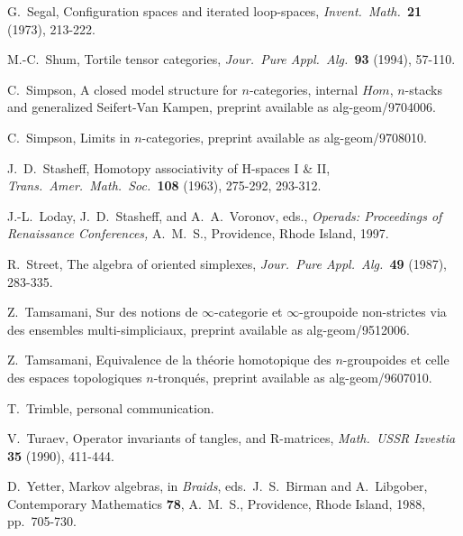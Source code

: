 {\begin{thebibliography}{10}
 G.\ Segal, Configuration spaces and iterated loop-spaces, 
{\sl Invent.\ Math.\ }{\bf 21} (1973), 213-222.

 M.-C.\ Shum, Tortile tensor categories, 
{\sl Jour.\ Pure Appl.\ Alg.\ }{\bf 93} (1994), 57-110.

 C.\ Simpson, A closed model structure for
$n$-categories, internal $Hom$, $n$-stacks and generalized Seifert-Van
Kampen, preprint available as alg-geom/9704006.

 C.\ Simpson, Limits in $n$-categories, preprint
available as alg-geom/9708010.

 J.\ D.\ Stasheff, Homotopy associativity of
H-spaces I \& II, {\sl Trans.\ Amer.\ Math.\ Soc.\ }{\bf 108} (1963),
275-292, 293-312. 

 J.-L.\ Loday, J.\ D.\ Stasheff, and A.\ A.\
Voronov, eds., {\sl Operads: Proceedings of Renaissance Conferences,}
A.\ M.\ S., Providence, Rhode Island, 1997.

 R.\ Street, The algebra of oriented simplexes, 
{\sl Jour.\ Pure Appl.\ Alg.\ }{\bf 49} (1987), 283-335.

 Z.\ Tamsamani, Sur des notions de
$\infty$-categorie et $\infty$-groupoide non-strictes via des
ensembles multi-simpliciaux, preprint available as
alg-geom/9512006.

 Z.\ Tamsamani, Equivalence de la th\'eorie
homotopique des $n$-groupoides et celle des espaces 
topologiques $n$-tronqu\'es, preprint available as 
alg-geom/9607010.

 T.\ Trimble, personal communication. 

 V.\ Turaev, Operator invariants of tangles, and
R-matrices, {\sl Math.\ USSR Izvestia} {\bf 35} (1990), 411-444.

 D.\ Yetter, Markov algebras, in {\sl Braids}, eds.\
J.\ S.\ Birman and A.\ Libgober, Contemporary Mathematics {\bf 78},
A.\ M.\ S., Providence, Rhode Island, 1988, pp.\ 705-730.

\end{thebibliography}
}













